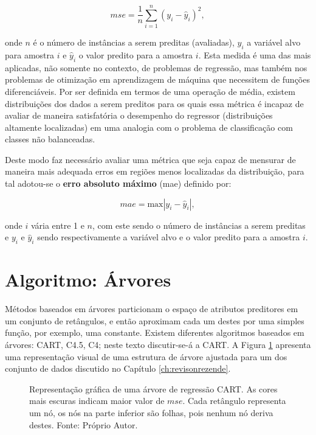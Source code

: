 \begin{equation}\label{eq:mse}
mse=\frac{1}{n}\sum_{i=1}^n(y_i-\hat{y}_i)^2\mbox{,}~
\end{equation}

onde $n$ é o número de instâncias a serem preditas (avaliadas), $y_i$ a variável alvo para amostra $i$ e $\hat{y}_i$ o valor predito para a amostra $i$. Esta medida é uma das mais aplicadas, não somente no contexto, de problemas de regressão, mas também nos problemas de otimização em aprendizagem de máquina que necessitem de funções diferenciáveis. Por ser definida em termos de uma operação de média, existem distribuições dos dados a serem preditos para os quais essa métrica é incapaz de avaliar de maneira satisfatória o desempenho do regressor (distribuições altamente localizadas) em uma analogia com o problema de classificação com classes não balanceadas.

Deste modo faz necessário avaliar uma métrica que seja capaz de mensurar de maneira mais adequada erros em regiões menos localizadas da distribuição, para tal adotou-se o {\bf erro absoluto máximo} (mae) definido por:

\begin{equation}
mae=\mbox{max}|y_{i}-\hat{y}_i|\mbox{,}~
\end{equation}

onde $i$ vária entre 1 e $n$, com este sendo o número de instâncias a serem preditas e $y_i$ e $\hat{y}_i$ sendo respectivamente a variável alvo e o valor predito para a amostra $i$.

\section{Algoritmo: Árvores}

Métodos baseados em árvores particionam o espaço de atributos preditores em um conjunto de retângulos, e então aproximam cada um destes por uma simples função, por exemplo, uma constante. Existem diferentes algoritmos baseados em árvores: CART, C4.5, C4; neste texto discutir-se-á a CART. A Figura \ref{fig:tree} apresenta uma representação visual de uma estrutura de árvore ajustada para um dos conjunto de dados discutido no Capítulo \ref{ch:revisonrezende}.

\begin{figure}[H]
\centering
{}
\caption{Representação gráfica de uma árvore de regressão CART. As cores mais escuras indicam maior valor de $mse$. Cada retângulo representa um nó, os nós na parte inferior são folhas, pois nenhum nó deriva destes. Fonte: Próprio Autor.}
\label{fig:tree}
\end{figure}

